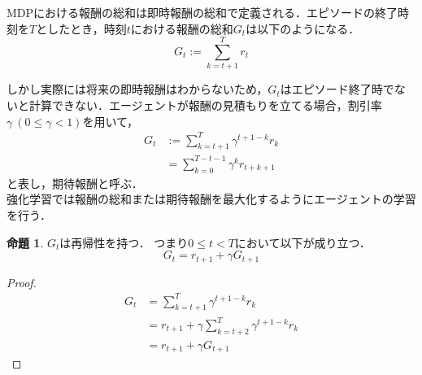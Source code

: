 \documentclass[a4paper,12pt]{jsreport}
\theoremstyle{definition}
\newtheorem{prop}{命題}
\begin{document}
MDPにおける報酬の総和は即時報酬の総和で定義される．エピソードの終了時刻を$T$としたとき，時刻$t$における報酬の総和$G_t$は以下のようになる．
\begin{equation}
    G_t:=\sum_{k=t+1}^Tr_t
\end{equation}

しかし実際には将来の即時報酬はわからないため，$G_t$はエピソード終了時でないと計算できない．エージェントが報酬の見積もりを立てる場合，割引率$\gamma\ (0\leq \gamma<1)$を用いて，
\begin{align}
    G_t&:=\sum_{k=t+1}^T \gamma^{t+1-k} r_k\\
    &=\sum_{k=0}^{T-t-1} \gamma^{k} r_{t+k+1}
\end{align}
と表し，期待報酬と呼ぶ．\\ 
強化学習では報酬の総和または期待報酬を最大化するようにエージェントの学習を行う．

\begin{prop}
    $G_t$は再帰性を持つ．
    つまり$0\leq t<T$において以下が成り立つ．
    \begin{equation}
        G_t=r_{t+1}+\gamma G_{t+1}
    \end{equation}
\end{prop}

\begin{proof}  
    \begin{align}
        G_t&=\sum_{k=t+1}^T \gamma^{t+1-k} r_k\\
        &=r_{t+1}+\gamma\sum_{k=t+2}^T \gamma^{t+1-k} r_k\\
        &=r_{t+1}+\gamma G_{t+1}
    \end{align}
\end{proof}
\end{document}
